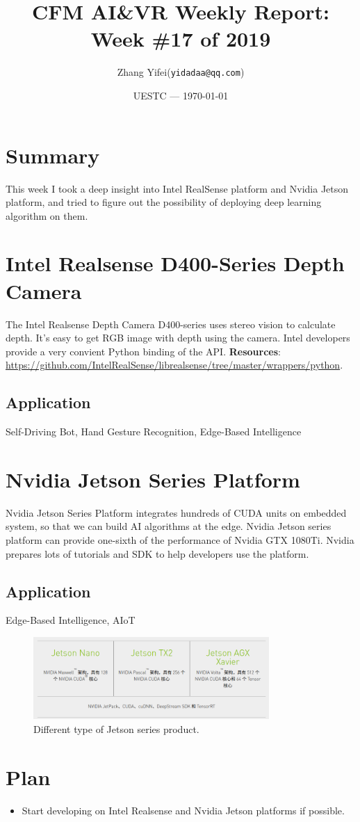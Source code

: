 \documentclass{article}
\title{CFM AI\&VR Weekly Report: Week \#17 of 2019}
\author{Zhang Yifei(\texttt{yidadaa@qq.com})}
\date{UESTC --- \today}
\begin{document}
\maketitle

\section{Summary}
This week I took a deep insight into Intel RealSense platform and Nvidia Jetson platform, and tried to figure out the possibility of deploying deep learning algorithm on them.

\section{Intel Realsense D400-Series Depth Camera}
The Intel Realsense Depth Camera D400-series uses stereo vision to calculate depth. It's easy to get RGB image with depth using the camera. Intel developers provide a very convient Python binding of the API. \textbf{Resources}: \url{https://github.com/IntelRealSense/librealsense/tree/master/wrappers/python}.
\subsection{Application}
Self-Driving Bot, Hand Gesture Recognition, Edge-Based Intelligence

\section{Nvidia Jetson Series Platform}
Nvidia Jetson Series Platform integrates hundreds of CUDA units on embedded system, so that we can build AI algorithms at the edge. Nvidia Jetson series platform can provide one-sixth of the performance of Nvidia GTX 1080Ti. Nvidia prepares lots of tutorials and SDK to help developers use the platform.

\subsection{Application}
Edge-Based Intelligence, AIoT

\begin{figure}[h]
    \centering
    \includegraphics[width=0.8\textwidth]{./img.png}
    \caption{Different type of Jetson series product.}
\end{figure}

\section{Plan}
\begin{itemize}
    \item Start developing on Intel Realsense and Nvidia Jetson platforms if possible.
\end{itemize}
\end{document}
